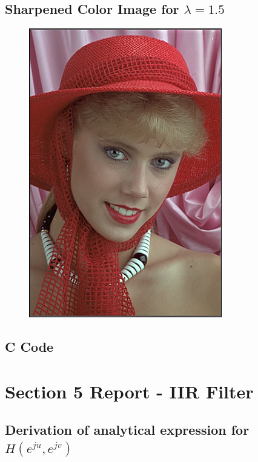 \documentclass{article}
\begin{document}
\subsection{Sharpened Color Image for $\lambda = 1.5$}
\begin{figure}[H]
    \centering
    \includegraphics[width=0.75\textwidth]{../results/sharpened.png}
    \begin{center}
    \end{center}
    \label{fig:A1}
\end{figure}
\subsection{C Code}


\section{Section 5 Report - IIR Filter}
\subsection{Derivation of analytical expression for $H(e^{ju}, e^{jv})$}
\end{document}
